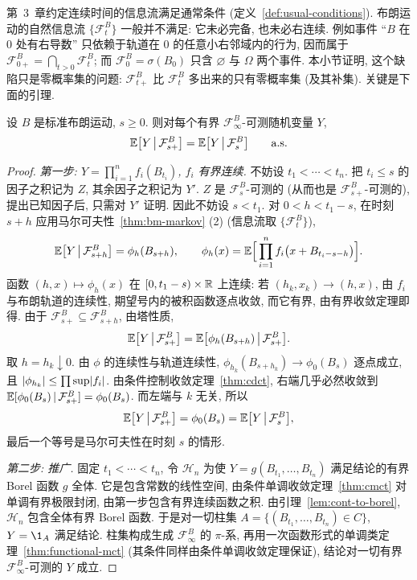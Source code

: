 第~3~章约定连续时间的信息流满足通常条件 (定义~\ref{def:usual-conditions}). 布朗运动的自然信息流 $\{\mathcal{F}^B_t\}$ 一般并不满足: 它未必完备, 也未必右连续. 例如事件 ``$B$ 在 $0$ 处有右导数'' 只依赖于轨道在 $0$ 的任意小右邻域内的行为, 因而属于 $\mathcal{F}^B_{0+}=\bigcap_{t>0}\mathcal{F}^B_t$; 而 $\mathcal{F}^B_0=\sigma(B_0)$ 只含 $\varnothing$ 与 $\Omega$ 两个事件. 本小节证明, 这个缺陷只是零概率集的问题: $\mathcal{F}^B_{t+}$ 比 $\mathcal{F}^B_t$ 多出来的只有零概率集 (及其补集). 关键是下面的引理.

\begin{lemma}\label{lem:germ}
设 $B$ 是标准布朗运动, $s\ge0$. 则对每个有界 $\mathcal{F}^B_\infty$-可测随机变量 $Y$,
\[
\mathbb{E}\big[Y\,\big|\,\mathcal{F}^B_{s+}\big]=\mathbb{E}\big[Y\,\big|\,\mathcal{F}^B_s\big]\qquad\text{a.s.}
\]
\end{lemma}

\begin{proof}
\emph{第一步: $Y=\prod_{i=1}^nf_i(B_{t_i})$, $f_i$ 有界连续.} 不妨设 $t_1<\cdots<t_n$. 把 $t_i\le s$ 的因子之积记为 $Z$, 其余因子之积记为 $Y'$. $Z$ 是 $\mathcal{F}^B_s$-可测的 (从而也是 $\mathcal{F}^B_{s+}$-可测的), 提出已知因子后, 只需对 $Y'$ 证明. 因此不妨设 $s<t_1$. 对 $0<h<t_1-s$, 在时刻 $s+h$ 应用马尔可夫性~\ref{thm:bm-markov} (2) (信息流取 $\{\mathcal{F}^B_t\}$),
\[
\mathbb{E}\big[Y\,\big|\,\mathcal{F}^B_{s+h}\big]=\phi_h(B_{s+h}),\qquad \phi_h(x)=\mathbb{E}\Big[\prod_{i=1}^nf_i\big(x+B_{t_i-s-h}\big)\Big].
\]
函数 $(h,x)\mapsto\phi_h(x)$ 在 $[0,t_1-s)\times\mathbb{R}$ 上连续: 若 $(h_k,x_k)\to(h,x)$, 由 $f_i$ 与布朗轨道的连续性, 期望号内的被积函数逐点收敛, 而它有界, 由有界收敛定理即得. 由于 $\mathcal{F}^B_{s+}\subseteq\mathcal{F}^B_{s+h}$, 由塔性质,
\[
\mathbb{E}\big[Y\,\big|\,\mathcal{F}^B_{s+}\big]=\mathbb{E}\big[\phi_h(B_{s+h})\,\big|\,\mathcal{F}^B_{s+}\big].
\]
取 $h=h_k\downarrow0$. 由 $\phi$ 的连续性与轨道连续性, $\phi_{h_k}(B_{s+h_k})\to\phi_0(B_s)$ 逐点成立, 且 $\lvert\phi_{h_k}\rvert\le\prod\sup\lvert f_i\rvert$. 由条件控制收敛定理~\ref{thm:cdct}, 右端几乎必然收敛到 $\mathbb{E}[\phi_0(B_s)\,|\,\mathcal{F}^B_{s+}]=\phi_0(B_s)$. 而左端与 $k$ 无关, 所以
\[
\mathbb{E}\big[Y\,\big|\,\mathcal{F}^B_{s+}\big]=\phi_0(B_s)=\mathbb{E}\big[Y\,\big|\,\mathcal{F}^B_s\big],
\]
最后一个等号是马尔可夫性在时刻 $s$ 的情形.

\emph{第二步: 推广.} 固定 $t_1<\cdots<t_n$, 令 $\mathcal{H}_n$ 为使 $Y=g(B_{t_1},\dots,B_{t_n})$ 满足结论的有界 Borel 函数 $g$ 全体. 它是包含常数的线性空间, 由条件单调收敛定理~\ref{thm:cmct} 对单调有界极限封闭, 由第一步包含有界连续函数之积. 由引理~\ref{lem:cont-to-borel}, $\mathcal{H}_n$ 包含全体有界 Borel 函数. 于是对一切柱集 $A=\{(B_{t_1},\dots,B_{t_n})\in C\}$, $Y=\1_A$ 满足结论. 柱集构成生成 $\mathcal{F}^B_\infty$ 的 $\pi$-系, 再用一次函数形式的单调类定理~\ref{thm:functional-mct} (其条件同样由条件单调收敛定理保证), 结论对一切有界 $\mathcal{F}^B_\infty$-可测的 $Y$ 成立.
\end{proof}

